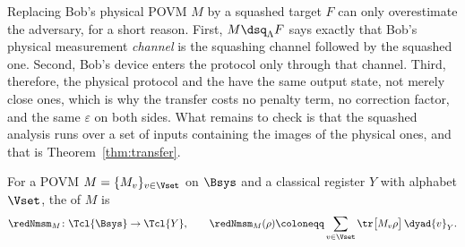
Replacing Bob's physical POVM $M$ by a squashed target $F$ can only
overestimate the adversary, for a short reason. First, $M\dsq_{\Lambda}F$ says
exactly that Bob's physical measurement \emph{channel} is the squashing channel
followed by the squashed one. Second, Bob's device enters the protocol only
through that channel. Third, therefore, the physical protocol and the
 have the same output state, not merely close ones,
which is why the transfer
costs no penalty term, no correction factor, and the same $\varepsilon$ on both
sides. What remains to check is that the squashed analysis runs over a set of
inputs containing the images of the physical ones, and that is
Theorem~\ref{thm:transfer}.

\begin{definition}\label{def:msm}
For a POVM $M=\{M_v\}_{v\in\Vset}$ on $\Bsys$ and a classical register $Y$ with
alphabet $\Vset$, the
of $M$ is
\begin{equation}\label{eq:msm}
  \redNmsm_M\colon\Tcl{\Bsys}\to\Tcl{Y},\qquad
  \redNmsm_M(\rho)\coloneqq\sum_{v\in\Vset}\tr\big[M_v\rho\big]\,\dyad{v}_{Y}.
\end{equation}
\end{definition}
